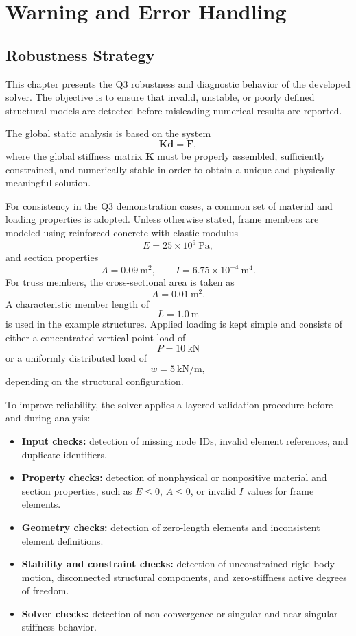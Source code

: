 \chapter{Warning and Error Handling}
\section{Robustness Strategy}

This chapter presents the Q3 robustness and diagnostic behavior of the developed solver. The objective is to ensure that invalid, unstable, or poorly defined structural models are detected before misleading numerical results are reported.

The global static analysis is based on the system
\[
\mathbf{K}\mathbf{d}=\mathbf{F},
\]
where the global stiffness matrix $\mathbf{K}$ must be properly assembled, sufficiently constrained, and numerically stable in order to obtain a unique and physically meaningful solution.

For consistency in the Q3 demonstration cases, a common set of material and loading properties is adopted. Unless otherwise stated, frame members are modeled using reinforced concrete with elastic modulus
\[
E = 25 \times 10^{9}\ \text{Pa},
\]
and section properties
\[
A = 0.09\ \text{m}^2, \qquad I = 6.75 \times 10^{-4}\ \text{m}^4.
\]
For truss members, the cross-sectional area is taken as
\[
A = 0.01\ \text{m}^2.
\]
A characteristic member length of
\[
L = 1.0\ \text{m}
\]
is used in the example structures. Applied loading is kept simple and consists of either a concentrated vertical point load of
\[
P = 10\ \text{kN}
\]
or a uniformly distributed load of
\[
w = 5\ \text{kN/m},
\]
depending on the structural configuration.

To improve reliability, the solver applies a layered validation procedure before and during analysis:
\begin{itemize}
    \item \textbf{Input checks:} detection of missing node IDs, invalid element references, and duplicate identifiers.
    \item \textbf{Property checks:} detection of nonphysical or nonpositive material and section properties, such as $E \leq 0$, $A \leq 0$, or invalid $I$ values for frame elements.
    \item \textbf{Geometry checks:} detection of zero-length elements and inconsistent element definitions.
    \item \textbf{Stability and constraint checks:} detection of unconstrained rigid-body motion, disconnected structural components, and zero-stiffness active degrees of freedom.
    \item \textbf{Solver checks:} detection of non-convergence or singular and near-singular stiffness behavior.
\end{itemize}

